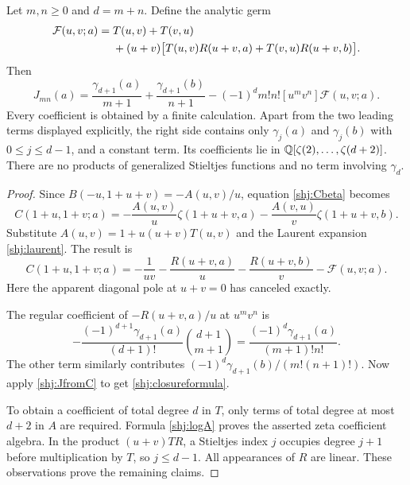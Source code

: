 \begin{theorem}\label{shj:closurethm}
Let $m,n\ge0$ and $d=m+n$. Define the analytic germ
\begin{align}
\mathcal F(u,v;a)={}&T(u,v)+T(v,u)\notag\\
&+(u+v)\big[T(u,v)R(u+v,a)+T(v,u)R(u+v,b)\big].
\label{shj:Fclosure}
\end{align}
Then
\begin{equation}\label{shj:closureformula}
\boxed{\displaystyle
J_{mn}(a)=\frac{\gamma_{d+1}(a)}{m+1}
+\frac{\gamma_{d+1}(b)}{n+1}
-(-1)^d m!n![u^m v^n]\mathcal F(u,v;a).}
\end{equation}
Every coefficient is obtained by a finite calculation. Apart from the two leading terms displayed explicitly, the right side contains only $\gamma_j(a)$ and $\gamma_j(b)$ with $0\le j\le d-1$, and a constant term. Its coefficients lie in
$\mathbb{Q}[\zeta(2),\ldots,\zeta(d+2)]$.
There are no products of generalized Stieltjes functions and no term involving $\gamma_d$.
\end{theorem}
\begin{proof}
Since $B(-u,1+u+v)=-A(u,v)/u$, equation \eqref{shj:Cbeta} becomes
\begin{equation}\label{shj:Cnear}
C(1+u,1+v;a)=-\frac{A(u,v)}u\zeta(1+u+v,a)
-\frac{A(v,u)}v\zeta(1+u+v,b).
\end{equation}
Substitute $A(u,v)=1+u(u+v)T(u,v)$ and the Laurent expansion \eqref{shj:laurent}. The result is
\begin{equation}\label{shj:Csplit}
C(1+u,1+v;a)=-\frac1{uv}
-\frac{R(u+v,a)}u-\frac{R(u+v,b)}v-\mathcal F(u,v;a).
\end{equation}
Here the apparent diagonal pole at $u+v=0$ has canceled exactly.

The regular coefficient of $-R(u+v,a)/u$ at $u^mv^n$ is
\[
-\frac{(-1)^{d+1}\gamma_{d+1}(a)}{(d+1)!}
\binom{d+1}{m+1}
=\frac{(-1)^d\gamma_{d+1}(a)}{(m+1)!n!}.
\]
The other term similarly contributes
$(-1)^d\gamma_{d+1}(b)/(m!(n+1)!)$.
Now apply \eqref{shj:JfromC} to get \eqref{shj:closureformula}.

To obtain a coefficient of total degree $d$ in $T$, only terms of total degree at most $d+2$ in $A$ are required. Formula \eqref{shj:logA} proves the asserted zeta coefficient algebra. In the product $(u+v)TR$, a Stieltjes index $j$ occupies degree $j+1$ before multiplication by $T$, so $j\le d-1$. All appearances of $R$ are linear. These observations prove the remaining claims.
\end{proof}

